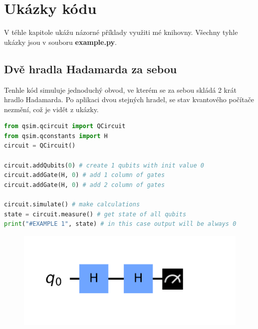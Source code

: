 \documentclass[11pt]{article}
\begin{document}
\newpage

\section{Ukázky kódu}
V téhle kapitole ukážu názorné příklady využiti mé knihovny.
Všechny tyhle ukázky jsou v souboru \textbf{example.py}.

\subsection{Dvě hradla Hadamarda za sebou}
Tenhle kód simuluje jednoduchý obvod, ve kterém se za sebou skládá 2 krát hradlo Hadamarda.
Po aplikaci dvou stejných hradel, se stav kvantového počítače nezmění, což je vidět z ukázky.
\begin{lstlisting}[language=Python, caption=Double Hadamard gates]
from qsim.qcircuit import QCircuit
from qsim.qconstants import H
circuit = QCircuit()

circuit.addQubits(0) # create 1 qubits with init value 0
circuit.addGate(H, 0) # add 1 column of gates
circuit.addGate(H, 0) # add 2 column of gates

circuit.simulate() # make calculations
state = circuit.measure() # get state of all qubits
print("#EXAMPLE 1", state) # in this case output will be always 0
\end{lstlisting}
\begin{figure}[H]
    \includegraphics[scale=.5]{two_h_gates_scheme}
    \centering
\end{figure}
\end{document}
